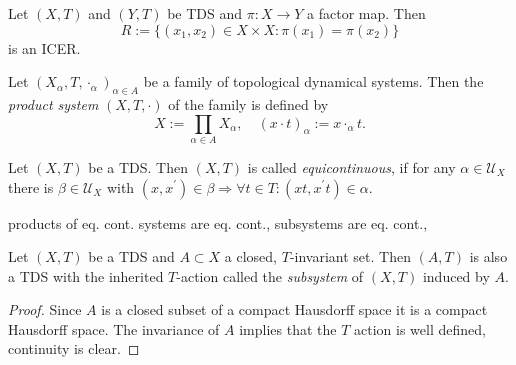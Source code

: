 \begin{proposition}
  Let $(X,T)$ and $(Y,T)$ be TDS and $\pi : X \to Y$ a factor map.
  Then 
  \begin{equation*}
    R:= \{ (x_1,x_2)  \in X \times X :  \pi (x_1) = \pi(x_2) \}
  \end{equation*}
  is an ICER.
\end{proposition}

\begin{definition}
  Let $(X_\alpha,T, \cdot_\alpha)_{\alpha \in A}$ be a family of topological dynamical systems.
  Then the \emph{product system} $(X, T, \cdot)$ of the family is defined by
  \begin{equation*}
    X := \prod_{\alpha \in A} X_\alpha, \quad (x\cdot t)_{\alpha} := x \cdot_\alpha t.
  \end{equation*}
\end{definition}

\begin{definition}
  Let $(X,T)$ be a TDS.
  Then $(X,T)$ is called \emph{equicontinuous}, if for any $\alpha \in \mathcal{U}_X$ there is $\beta \in \mathcal{U}_X$ with $(x, x^\prime ) \in \beta \Rightarrow \forall t \in T: (xt,x^\prime t) \in \alpha$.
\end{definition}

\begin{proposition}
  products of eq. cont. systems are eq. cont., subsystems are eq. cont., 
\end{proposition}


\begin{proposition}[Subsystem]
  Let $(X,T)$ be a TDS and $A \subset X$ a closed, $T$-invariant set.
  Then $(A,T)$ is also a TDS with the inherited $T$-action called the \emph{subsystem} of $(X,T)$ induced by $A$.
\end{proposition}
\begin{proof}
  Since $A$ is a closed subset of a compact Hausdorff space it is a compact Hausdorff space. The invariance of $A$ implies that the $T$ action is well defined, continuity is clear. 
\end{proof}

